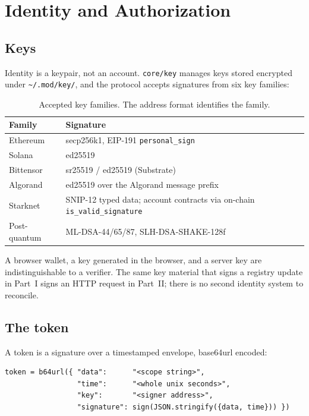 \documentclass[11pt,a4paper]{article}
\begin{document}
\section{Identity and Authorization}
\label{sec:identity}

\subsection{Keys}

Identity is a keypair, not an account. \texttt{core/key} manages keys stored
encrypted under \texttt{\textasciitilde/.mod/key/}, and the protocol accepts
signatures from six key families:

\begin{table}[H]
\centering
\begin{tabularx}{\textwidth}{lX}
\toprule
\textbf{Family} & \textbf{Signature} \\
\midrule
Ethereum & secp256k1, EIP-191 \texttt{personal\_sign} \\
Solana & ed25519 \\
Bittensor & sr25519 / ed25519 (Substrate) \\
Algorand & ed25519 over the Algorand message prefix \\
Starknet & SNIP-12 typed data; account contracts via on-chain \texttt{is\_valid\_signature} \\
Post-quantum & ML-DSA-44/65/87, SLH-DSA-SHAKE-128f \\
\bottomrule
\end{tabularx}
\caption{Accepted key families. The address format identifies the family.}
\end{table}

A browser wallet, a key generated in the browser, and a server key are
indistinguishable to a verifier. The same key material that signs a registry
update in Part~I signs an HTTP request in Part~II; there is no second identity
system to reconcile.

\subsection{The token}

A token is a signature over a timestamped envelope, base64url encoded:

\begin{lstlisting}[style=python]
token = b64url({ "data":      "<scope string>",
                 "time":      "<whole unix seconds>",
                 "key":       "<signer address>",
                 "signature": sign(JSON.stringify({data, time})) })
\end{lstlisting}
\end{document}
